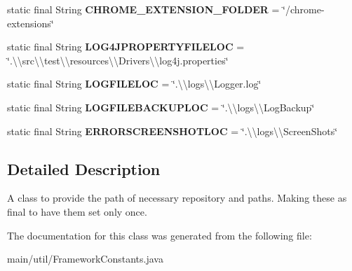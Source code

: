 \begin{DoxyCompactItemize}
\item 
\mbox{\label{classmain_1_1util_1_1_framework_constants_a7b8e916dd0e23b7c49c0c33966c18743}} 
static final String {\bfseries C\+H\+R\+O\+M\+E\+\_\+\+E\+X\+T\+E\+N\+S\+I\+O\+N\+\_\+\+F\+O\+L\+D\+ER} = \char`\"{}/chrome-\/extensions\char`\"{}
\item 
\mbox{\label{classmain_1_1util_1_1_framework_constants_a40c286eea9534c84a3edc4f6dcf24be0}} 
static final String {\bfseries L\+O\+G4\+J\+P\+R\+O\+P\+E\+R\+T\+Y\+F\+I\+L\+E\+L\+OC} = \char`\"{}.\textbackslash{}\textbackslash{}src\textbackslash{}\textbackslash{}test\textbackslash{}\textbackslash{}resources\textbackslash{}\textbackslash{}\+Drivers\textbackslash{}\textbackslash{}log4j.\+properties\char`\"{}
\item 
\mbox{\label{classmain_1_1util_1_1_framework_constants_aa5f8d30ec17c454473052f96f5204549}} 
static final String {\bfseries L\+O\+G\+F\+I\+L\+E\+L\+OC} = \char`\"{}.\textbackslash{}\textbackslash{}logs\textbackslash{}\textbackslash{}\+Logger.\+log\char`\"{}
\item 
\mbox{\label{classmain_1_1util_1_1_framework_constants_abfc9634deff385aea74a4d30efbbe6fd}} 
static final String {\bfseries L\+O\+G\+F\+I\+L\+E\+B\+A\+C\+K\+U\+P\+L\+OC} = \char`\"{}.\textbackslash{}\textbackslash{}logs\textbackslash{}\textbackslash{}\+Log\+Backup\char`\"{}
\item 
\mbox{\label{classmain_1_1util_1_1_framework_constants_ae14f36d897208826e889a2b7cc8726d4}} 
static final String {\bfseries E\+R\+R\+O\+R\+S\+C\+R\+E\+E\+N\+S\+H\+O\+T\+L\+OC} = \char`\"{}.\textbackslash{}\textbackslash{}logs\textbackslash{}\textbackslash{}\+Screen\+Shots\char`\"{}
\end{DoxyCompactItemize}


\subsection{Detailed Description}
A class to provide the path of necessary repository and paths. Making these as final to have them set only once. 

The documentation for this class was generated from the following file\+:\begin{DoxyCompactItemize}
\item 
main/util/Framework\+Constants.\+java\end{DoxyCompactItemize}
